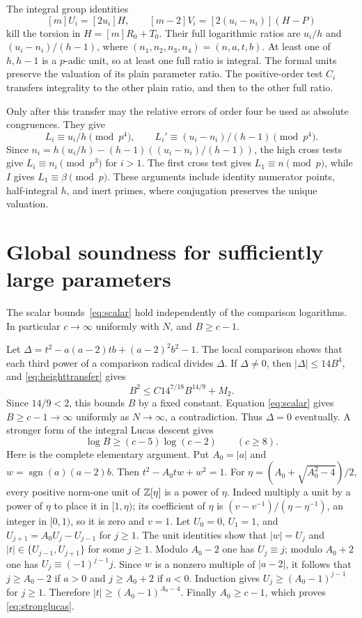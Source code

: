 \documentclass[11pt,a4paper]{article}
\begin{document}
The integral group identities
\[
                  [m]U_i=[2u_i]H,\qquad
                  [m-2]V_i=[2(u_i-n_i)](H-P)
\]
kill the torsion in $H=[m]R_0+T_0$. Their full logarithmic ratios
are $u_i/h$ and $(u_i-n_i)/(h-1)$, where
$(n_1,n_2,n_3,n_4)=(n,a,t,b)$. At least one of $h,h-1$ is a
$p$-adic unit, so at least one full ratio is integral. The formal
units preserve the valuation of its plain parameter ratio.
The positive-order test $C_i$ transfers integrality to the other
plain ratio, and then to the other full ratio.

Only after this transfer may the relative errors of order four
be used as absolute congruences. They give
\[
 L_i\equiv u_i/h\pmod{p^4},\qquad
 L_i'\equiv(u_i-n_i)/(h-1)\pmod{p^4}.
\]
Since $n_i=h(u_i/h)-(h-1)((u_i-n_i)/(h-1))$, the high cross tests
give $L_i\equiv n_i\pmod{p^3}$ for $i>1$. The first cross test
gives $L_1\equiv n\pmod p$, while $I$ gives $L_1\equiv\beta\pmod p$.
These arguments include identity numerator points, half-integral $h$,
and inert primes, where conjugation preserves the unique valuation.

\section{Global soundness for sufficiently large parameters}\label{sec:soundness}
The scalar bounds~\eqref{eq:scalar} hold independently of the
comparison logarithms. In particular $c\to\infty$ uniformly with $N$,
and $B\ge c-1$.

Let
$\Delta=t^2-a(a-2)tb+(a-2)^2b^2-1$.
The local comparison shows that each third power of a comparison
radical divides $\Delta$. If $\Delta\ne0$, then
$|\Delta|\le14B^4$, and \eqref{eq:heighttransfer} gives
\[
                  B^2\le C14^{7/18}B^{14/9}+M_2.
\]
Since $14/9<2$, this bounds $B$ by a fixed constant. Equation
\eqref{eq:scalar} gives $B\ge c-1\to\infty$ uniformly as
$N\to\infty$, a contradiction. Thus $\Delta=0$ eventually.
A stronger form of the integral Lucas descent gives
\begin{equation}\label{eq:stronglucas}
              \log B\ge(c-5)\log(c-2)\qquad(c\ge8).
\end{equation}
Here is the complete elementary argument. Put $A_0=|a|$ and
$w=\operatorname{sgn}(a)(a-2)b$. Then
$t^2-A_0tw+w^2=1$. For
$\eta=(A_0+\sqrt{A_0^2-4})/2$, every positive norm-one unit of
$\mathbb Z[\eta]$ is a power of $\eta$. Indeed multiply a unit by a
power of $\eta$ to place it in $[1,\eta)$; its coefficient of
$\eta$ is $(v-v^{-1})/(\eta-\eta^{-1})$, an integer in $[0,1)$,
so it is zero and $v=1$.
Let $U_0=0$, $U_1=1$, and $U_{j+1}=A_0U_j-U_{j-1}$ for $j\ge1$.
The unit identities show that $|w|=U_j$ and
$|t|\in\{U_{j-1},U_{j+1}\}$ for some $j\ge1$.
Modulo $A_0-2$ one has $U_j\equiv j$; modulo $A_0+2$ one has
$U_j\equiv(-1)^{j-1}j$. Since $w$ is a nonzero multiple of
$|a-2|$, it follows that $j\ge A_0-2$ if $a>0$ and
$j\ge A_0+2$ if $a<0$. Induction gives
$U_j\ge(A_0-1)^{j-1}$ for $j\ge1$. Therefore
$|t|\ge(A_0-1)^{A_0-4}$. Finally $A_0\ge c-1$, which proves
\eqref{eq:stronglucas}.
\end{document}
